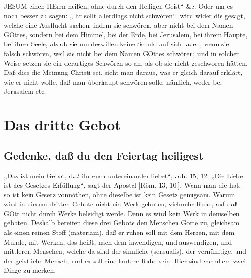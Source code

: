 JESUM einen HErrn heißen, ohne durch den Heiligen Geist“ \&c. Oder um es noch besser zu sagen: „Ihr sollt allerdings nicht schwören“, wird wider die gesagt, welche eine Ausflucht
suchen, indem sie schwören, aber nicht bei dem Namen GOttes, sondern bei dem Himmel, bei der Erde, bei Jerusalem, bei ihrem Haupte, bei ihrer Seele, als ob sie um deswillen keine Schuld auf sich laden, wenn sie falsch schwören, weil sie nicht bei dem Namen GOttes schwören; und in solcher Weise setzen sie ein derartiges Schwören so an, als ob sie nicht geschworen hätten. Daß dies die Meinung Christi sei, sieht man daraus, was er gleich darauf erklärt, wie er nicht wolle, daß man überhaupt schwören solle, nämlich, weder bei Jerusalem etc.

\section{Das dritte Gebot}

\subsection{Gedenke, daß du den Feiertag heiligest}

„Das ist mein Gebot, daß ihr euch untereinander liebet“, Joh. 15, 12. „Die Liebe ist des Gesetzes Erfüllung“, sagt der Apostel [Röm. 13, 10.]. Wenn man die hat, so ist kein Gesetz vonnöthen, ohne dieselbe ist kein Gesetz genugsam. Warum wird in diesem dritten Gebote nicht ein Werk geboten, vielmehr Ruhe, auf daß GOtt nicht durch Werke beleidigt werde. Denn es wird kein Werk in demselben geboten. Deshalb bereiten diese drei Gebote den Menschen Gotte zu, gleichsam als einen reinen Stoff (materiam), daß er ruhen soll mit dem Herzen, mit dem Munde, mit Werken, das heißt, nach dem inwendigen, und auswendigen, und mittleren Menschen, welche da sind der sinnliche (sensualis), der vernünftige, und der geistliche Mensch; und es soll eine lautere Ruhe sein. Hier sind vor allem zwei Dinge zu merken.


